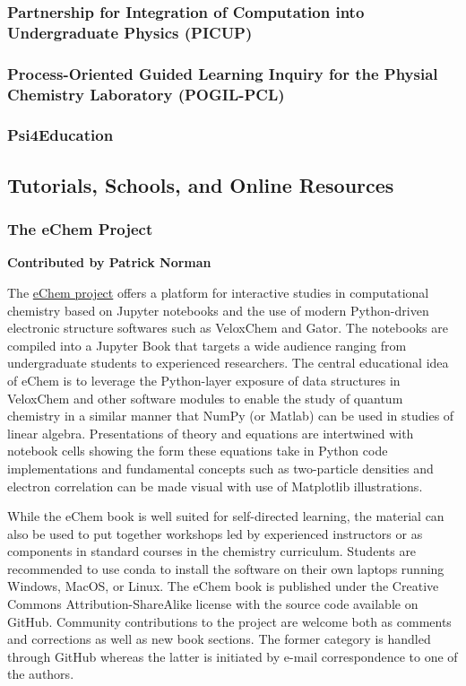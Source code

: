 \documentclass[9pt,review]{livecoms}
\begin{document}
\subsubsection{Partnership for Integration of Computation into Undergraduate Physics (PICUP)}


\subsubsection{Process-Oriented Guided Learning Inquiry for the Physial Chemistry Laboratory (POGIL-PCL)}


\subsubsection{Psi4Education}


\subsection{Tutorials, Schools, and Online Resources}

\subsubsection{The eChem Project}

\textbf{Contributed by Patrick Norman}

The \href{https://doi.org/10.30746/978-91-988114-0-7}{eChem project} offers a platform for interactive studies in computational chemistry based on Jupyter notebooks and the use of modern Python-driven electronic structure softwares such as VeloxChem  and Gator.  
The notebooks are compiled into a Jupyter Book that targets a wide audience ranging from undergraduate students to experienced researchers.
The central educational idea of eChem is to leverage the Python-layer exposure of data structures in VeloxChem and other software modules to enable the study of quantum chemistry in a similar manner that NumPy (or Matlab) can be used in studies of linear algebra. Presentations of theory and equations are intertwined with notebook cells showing the form these equations take in Python code implementations and fundamental concepts such as two-particle densities and electron correlation can be made visual with use of Matplotlib illustrations. 

While the eChem book is well suited for self-directed learning, the material can also be used to put together workshops led by experienced instructors or as components in standard courses in the chemistry curriculum.  Students are recommended to use conda to install the software on their own laptops running Windows, MacOS, or Linux. 
The eChem book is published under the Creative Commons Attribution-ShareAlike license with the source code available on GitHub.  Community contributions to the project are welcome both as comments and corrections as well as new book sections. The former category is handled through GitHub whereas the latter is initiated by e-mail correspondence to one of the authors.
\end{document}
